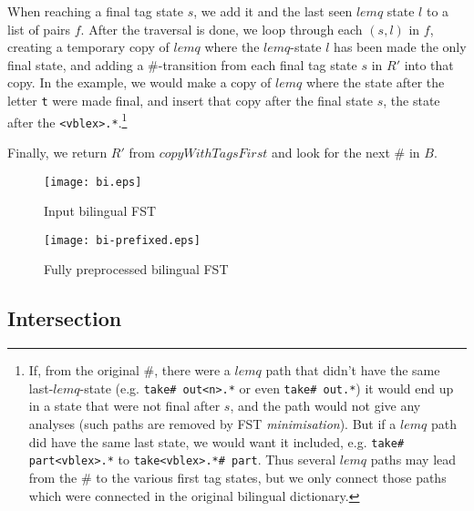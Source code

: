 \documentclass[10pt, a4paper]{article}
\newcommand{\ana}[1]{\texttt{#1}}
\begin{document}
When reaching a final tag state $s$, we add it and the last seen
$lemq$ state $l$ to a list of pairs $f$. After the traversal is done,
we loop through each $(s,l)$ in $f$, creating a temporary copy of
$lemq$ where the $lemq$-state $l$ has been made the only final state,
and adding a \#-transition from each final tag state $s$ in $R'$ into
that copy. In the example, we would make a copy of $lemq$ where the
state after the letter \ana{t} were made final, and insert that copy
after the final state $s$, the state after the
\ana{<vblex>.*}.\footnote{If, from the original \#, there were a
  $lemq$ path that didn't have the same last-$lemq$-state (e.g.
  \ana{take\# out<n>.*} or even \ana{take\# out.*}) it would end up in
  a state that were not final after $s$, and the path would not give
  any analyses (such paths are removed by FST \emph{minimisation}).
  But if a $lemq$ path did have the same last state, we would want it
  included, e.g. \ana{take\# part<vblex>.*} to \ana{take<vblex>.*\#
    part}. Thus several $lemq$ paths may lead from the \# to the
  various first tag states, but we only connect those paths which were
  connected in the original bilingual dictionary.}

Finally, we return $R'$ from $copyWithTagsFirst$ and look for the next
\# in $B$.

\begin{figure}[h]
  \begin{center}
    \texttt{[image: bi.eps]}
    \caption{Input bilingual FST}
    \label{fig:bi-prefixed}
  \end{center}
\end{figure}

\begin{figure}[h]
  \begin{center}
    \texttt{[image: bi-prefixed.eps]}
    \caption{Fully preprocessed bilingual FST}
    \label{fig:bi-prefixed}
  \end{center}
\end{figure}


\subsection{Intersection}

\end{document}
